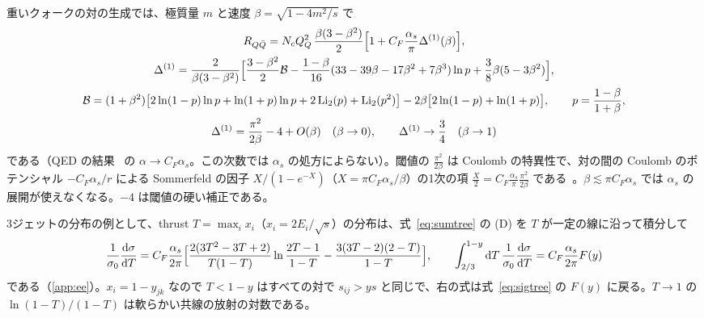 \documentclass[a4paper,10pt]{ltjsarticle}
\newcommand{\dd}{\mathrm{d}}
\begin{document}
重いクォークの対の生成では、極質量 $m$ と速度 $\beta=\sqrt{1-4m^2/s}$ で
\begin{equation}
\begin{gathered}
R_{Q\bar Q}=N_cQ_Q^2\,\frac{\beta(3-\beta^2)}2\Bigl[1+C_F\frac{\alpha_s}{\pi}\Delta^{(1)}(\beta)\Bigr],\\
\Delta^{(1)}=\frac{2}{\beta(3-\beta^2)}\Bigl[\frac{3-\beta^2}2\mathcal B-\frac{1-\beta}{16}(33-39\beta-17\beta^2+7\beta^3)\ln p+\frac38\beta(5-3\beta^2)\Bigr],\\
\mathcal B=(1+\beta^2)\bigl[2\ln(1-p)\ln p+\ln(1+p)\ln p+2\,\mathrm{Li}_2(p)+\mathrm{Li}_2(p^2)\bigr]-2\beta\bigl[2\ln(1-p)+\ln(1+p)\bigr],\qquad p=\frac{1-\beta}{1+\beta},\\
\Delta^{(1)}=\frac{\pi^2}{2\beta}-4+O(\beta)\quad(\beta\to0),\qquad \Delta^{(1)}\to\frac34\quad(\beta\to1)
\end{gathered}
\label{eq:rmass}
\end{equation}
である（QED の結果~\cite{ht98} の $\alpha\to C_F\alpha_s$。この次数では $\alpha_s$ の処方によらない）。閾値の $\frac{\pi^2}{2\beta}$ は Coulomb の特異性で、対の間の Coulomb のポテンシャル $-C_F\alpha_s/r$ による Sommerfeld の因子 $X/(1-e^{-X})$（$X=\pi C_F\alpha_s/\beta$）の1次の項 $\frac X2=C_F\frac{\alpha_s}\pi\frac{\pi^2}{2\beta}$ である~\cite{cm98}。$\beta\lesssim\pi C_F\alpha_s$ では $\alpha_s$ の展開が使えなくなる。$-4$ は閾値の硬い補正である。

3ジェットの分布の例として、thrust $T=\max_ix_i$（$x_i=2E_i/\sqrt s$）の分布は、式~\eqref{eq:sumtree} の (D) を $T$ が一定の線に沿って積分して
\begin{equation}
\frac1{\sigma_0}\frac{\dd\sigma}{\dd T}=C_F\frac{\alpha_s}{2\pi}\Bigl[\frac{2(3T^2-3T+2)}{T(1-T)}\ln\frac{2T-1}{1-T}-\frac{3(3T-2)(2-T)}{1-T}\Bigr],\qquad
\int_{2/3}^{1-y}\dd T\,\frac1{\sigma_0}\frac{\dd\sigma}{\dd T}=C_F\frac{\alpha_s}{2\pi}F(y)
\label{eq:thrust}
\end{equation}
である（\ref{app:ee}）。$x_i=1-y_{jk}$ なので $T<1-y$ はすべての対で $s_{ij}>ys$ と同じで、右の式は式~\eqref{eq:sigtree} の $F(y)$ に戻る。$T\to1$ の $\ln(1-T)/(1-T)$ は軟らかい共線の放射の対数である。
\end{document}

